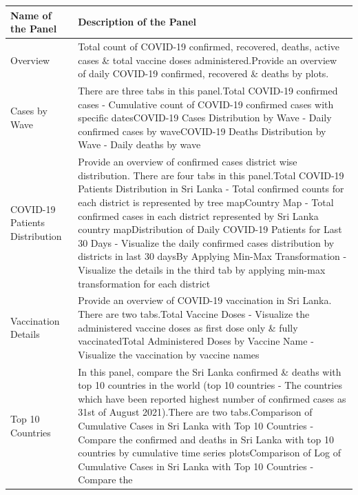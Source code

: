 \documentclass[
]{article}
\begin{document}
\begin{longtable}[]{@{}
  >{\raggedright\arraybackslash}p{}
  >{\raggedright\arraybackslash}p{}@{}}
\toprule
\textbf{Name of the Panel} & \textbf{Description of the Panel} \\
\midrule
\endhead
Overview & Total count of COVID-19 confirmed, recovered, deaths, active
cases \& total vaccine doses administered.\hfill\break Provide an
overview of daily COVID-19 confirmed, recovered \& deaths by
plots.\hfill\break \\
Cases by Wave & There are three tabs in this panel.\hfill\break  * Total
COVID-19 confirmed cases - Cumulative count of COVID-19 confirmed cases
with specific dates\hfill\break * COVID-19 Cases Distribution by Wave -
Daily confirmed cases by wave\hfill\break * COVID-19 Deaths Distribution
by Wave - Daily deaths by wave\hfill\break \\
COVID-19 Patients Distribution & Provide an overview of confirmed cases
district wise distribution. There are four tabs in this
panel.\hfill\break * Total COVID-19 Patients Distribution in Sri Lanka -
Total confirmed counts for each district is represented by tree
map\hfill\break * Country Map - Total confirmed cases in each district
represented by Sri Lanka country map\hfill\break * Distribution of Daily
COVID-19 Patients for Last 30 Days - Visualize the daily confirmed cases
distribution by districts in last 30 days\hfill\break * By Applying
Min-Max Transformation - Visualize the details in the third tab by
applying min-max transformation for each district\hfill\break \\
Vaccination Details & Provide an overview of COVID-19 vaccination in Sri
Lanka. There are two tabs.\hfill\break * Total Vaccine Doses - Visualize
the administered vaccine doses as first dose only \& fully
vaccinated\hfill\break * Total Administered Doses by Vaccine Name -
Visualize the vaccination by vaccine names\hfill\break \\
Top 10 Countries & In this panel, compare the Sri Lanka confirmed \&
deaths with top 10 countries in the world (top 10 countries - The
countries which have been reported highest number of confirmed cases as
31st of August 2021).\hfill\break There are two
tabs.\hfill\break * Comparison of Cumulative Cases in Sri Lanka with Top
10 Countries - Compare the confirmed and deaths in Sri Lanka with top 10
countries by cumulative time series plots\hfill\break * Comparison of
Log of Cumulative Cases in Sri Lanka with Top 10 Countries - Compare the

\end{longtable}
\end{document}
